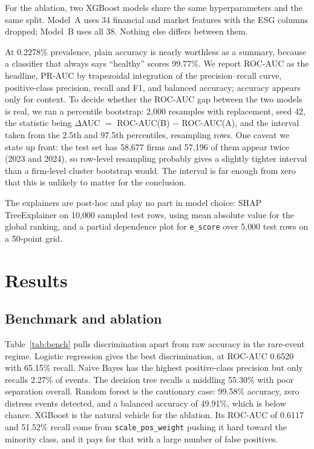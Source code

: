 \documentclass[conference]{IEEEtran}
\newcommand{\code}[1]{\texttt{\small #1}}
\begin{document}
For the ablation, two XGBoost models share the same hyperparameters and the same
split. Model~A uses 34 financial and market features with the ESG columns
dropped; Model~B uses all 38. Nothing else differs between them.

At 0.2278\% prevalence, plain accuracy is nearly worthless as a summary, because
a classifier that always says ``healthy'' scores 99.77\%. We report ROC-AUC as
the headline, PR-AUC by trapezoidal integration of the precision--recall curve,
positive-class precision, recall and F1, and balanced accuracy; accuracy appears
only for context. To decide whether the ROC-AUC gap between the two models is
real, we ran a percentile bootstrap: 2{,}000 resamples with replacement, seed
42, the statistic being $\Delta$AUC $=$ ROC-AUC(B) $-$ ROC-AUC(A), and the
interval taken from the 2.5th and 97.5th percentiles, resampling rows. One
caveat we state up front: the test set has 58{,}677 firms and 57{,}196 of them
appear twice (2023 and 2024), so row-level resampling probably gives a slightly
tighter interval than a firm-level cluster bootstrap would. The interval is far
enough from zero that this is unlikely to matter for the conclusion.

The explainers are post-hoc and play no part in model choice: SHAP TreeExplainer
\cite{lundberg2017} on 10{,}000 sampled test rows, using mean absolute value for
the global ranking, and a partial dependence plot for \code{e\_score} over
5{,}000 test rows on a 50-point grid.

\section{Results}

\subsection{Benchmark and ablation}
Table~\ref{tab:bench} pulls discrimination apart from raw accuracy in the
rare-event regime. Logistic regression gives the best discrimination, at ROC-AUC
0.6520 with 65.15\% recall. Naive Bayes has the highest positive-class precision
but only recalls 2.27\% of events. The decision tree recalls a middling 55.30\%
with poor separation overall. Random forest is the cautionary case: 99.58\%
accuracy, zero distress events detected, and a balanced accuracy of 49.91\%,
which is below chance. XGBoost is the natural vehicle for the ablation. Its
ROC-AUC of 0.6117 and 51.52\% recall come from \code{scale\_pos\_weight} pushing
it hard toward the minority class, and it pays for that with a large number of
false positives.
\end{document}
